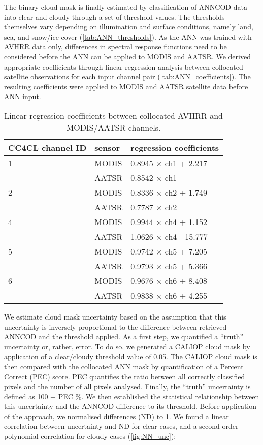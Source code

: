 The binary cloud mask is finally estimated by classification of ANNCOD data into clear and cloudy through a set of threshold values. The thresholds themselves vary depending on illumination and surface conditions, namely land, sea, and snow/ice cover (\autoref{tab:ANN_thresholds}). As the ANN was trained with AVHRR data only, differences in spectral response functions need to be considered before the ANN can be applied to MODIS and AATSR. We derived appropriate coefficients through linear regression analysis between collocated satellite observations for each input channel pair (\autoref{tab:ANN_coefficients}). The resulting coefficients were applied to MODIS and AATSR satellite data before ANN input.

\begin{table}[h]
  \caption{Linear regression coefficients between collocated AVHRR and MODIS/AATSR channels.}
  \begin{tabular}{l|l|l} %
    \hline
    CC4CL channel ID & sensor & regression coefficients \\
    \hline
    1 & MODIS & 0.8945 $\times$ ch1 + 2.217 \\
    & AATSR & 0.8542 $\times$ ch1 \\ \hline
    2 & MODIS & 0.8336 $\times$ ch2 + 1.749 \\
    & AATSR & 0.7787 $\times$ ch2 \\ \hline
    4 & MODIS & 0.9944 $\times$ ch4 + 1.152 \\
    & AATSR & 1.0626 $\times$ ch4 - 15.777 \\ \hline
    5 & MODIS & 0.9742 $\times$ ch5 + 7.205 \\
    & AATSR & 0.9793 $\times$ ch5 + 5.366 \\ \hline
    6 & MODIS & 0.9676 $\times$ ch6 + 8.408 \\
    & AATSR & 0.9838 $\times$ ch6 + 4.255 \\
    \hline
  \end{tabular}
  \label{tab:ANN_coefficients}
\end{table}

We estimate cloud mask uncertainty based on the assumption that this uncertainty is inversely proportional to the difference between retrieved ANNCOD and the threshold applied. As a first step, we quantified a ``truth'' uncertainty or, rather, error. To do so, we generated a CALIOP cloud mask by application of a clear/cloudy threshold value of 0.05. The CALIOP cloud mask is then compared with the collocated ANN mask by quantification of a Percent Correct (PEC) score. PEC quantifies the ratio between all correctly classified pixels and the number of all pixels analysed. Finally, the ``truth'' uncertainty is defined as 100 $-$ PEC \%. We then established the statistical relationship between this uncertainty and the ANNCOD difference to its threshold. Before application of the approach, we normalised differences (ND) to 1. We found a linear correlation between uncertainty and ND for clear cases, and a second order polynomial correlation for cloudy cases (\autoref{fig:NN_unc}):

